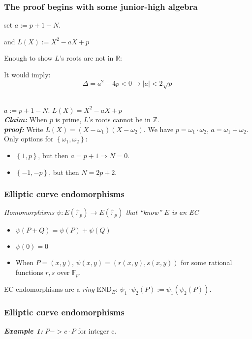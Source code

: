 \documentclass[shadesubsections,compress,14pt,mathserif]{beamer}
\newcommand{\F}{\ensuremath{{\mathbb F}_p}}
\newcommand{\Fclosure}{\ensuremath{{\overline{\mathbb{F}}}_p}}
\newcommand{\set}[1]{\ensuremath{\left\{#1\right\}}}
\newcommand{\defeq}{\ensuremath{:=}}
\newcommand{\hl}[1]{\textbf{\textit{#1}}}
\newcommand{\nl}{\\ \pause \vspace{0.2in}}
\begin{document}
\begin{frame}
\frametitle{The proof begins with some junior-high algebra}
set $a\defeq p+1-N$.

and $L(X)
\defeq X^2-aX+p
$\nl


Enough to show $L$'s roots are not in $\mathbb{R}$:\nl

It would imply:
\[\Delta=
a^2-4p<0
\rightarrow |a|<2\sqrt p\]\nl
\end{frame}
\begin{frame}
$a\defeq p+1-N$. $L(X)= X^2-aX+p$\nl
 \hl{Claim:} When $p$ is prime, $L$'s roots cannot be in $\mathbb{Z}$.\nl
 \hl{proof:}
 Write $L(X)=(X-\omega_1)(X-\omega_2)$.
 We have $p=\omega_1\cdot \omega_2$, $a=\omega_1+\omega_2$.\nl
 Only options for $\set{\omega_1,\omega_2}$:\nl
 \begin{itemize}
  \item $\set{1,p}$,  but then $a=p+1\Rightarrow N=0$.\pause
  \item $\set{-1,-p}$, but then $N=2p+2$. 
 \end{itemize}

\end{frame}


\begin{frame}
\frametitle{Elliptic curve endomorphisms}

\emph{Homomorphisms $\psi:E(\Fclosure)  \to E(\Fclosure)$ that ``know'' $E$ is an EC}\nl
\begin{itemize}
 \item 
$\psi(P+Q) = \psi(P)+\psi(Q)$
\item $\psi(0) = 0$\pause
\item When $P=(x,y)$,
$\psi(x,y) = (r(x,y),s(x,y))$
for some rational functions $r,s$ over \F.\pause
\end{itemize}
EC endomorphisms are a \emph{ring} $\mathrm{END}_E$: $\psi_1\cdot \psi_2(P) \defeq \psi_1(\psi_2(P))$.
\end{frame}
\begin{frame}
\frametitle{Elliptic curve endomorphisms}

\hl{Example 1:}
$P-> c\cdot P$   for  integer c. \pause

\end{frame}
\end{document}
